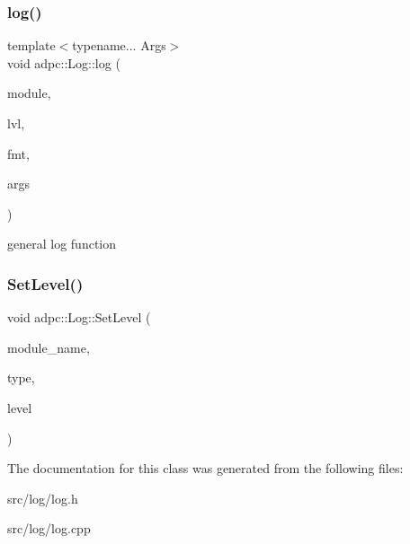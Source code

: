 \subsubsection{\texorpdfstring{log()}{log()}}
{\footnotesize\ttfamily template$<$typename... Args$>$ \\
void adpc\+::\+Log\+::log (\begin{DoxyParamCaption}\item[{size\+\_\+t}]{module,  }\item[{\hyperlink{log__config_8h_a172986fa5f658c5fe0b42bd954e9e133}{Log\+Level}}]{lvl,  }\item[{const char $\ast$}]{fmt,  }\item[{const Args \&...}]{args }\end{DoxyParamCaption})\hspace{0.3cm}{\ttfamily [inline]}}

general log function \mbox{\label{classadpc_1_1Log_a2e8bf1e2c8ac8381be9022df60530f87}} 
\subsubsection{\texorpdfstring{Set\+Level()}{SetLevel()}}
{\footnotesize\ttfamily void adpc\+::\+Log\+::\+Set\+Level (\begin{DoxyParamCaption}\item[{const string \&}]{module\+\_\+name,  }\item[{const Log\+Sink\+Type}]{type,  }\item[{const \hyperlink{log__config_8h_a172986fa5f658c5fe0b42bd954e9e133}{Log\+Level}}]{level }\end{DoxyParamCaption})\hspace{0.3cm}{\ttfamily [inline]}}



The documentation for this class was generated from the following files\+:\begin{DoxyCompactItemize}
\item 
src/log/log.\+h\item 
src/log/log.\+cpp\end{DoxyCompactItemize}
